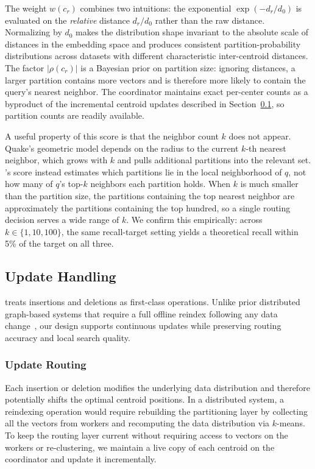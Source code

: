 \documentclass[sigconf,review,anonymous]{acmart}
\begin{document}
    The weight $w(c_r)$ combines two intuitions: the exponential $\exp(- d_r / d_0)$ is evaluated on the \emph{relative} distance $d_r / d_0$ rather than the raw distance. Normalizing by $d_0$ makes the distribution shape invariant to the absolute scale of distances in the embedding space and produces consistent partition-probability distributions across datasets with different characteristic inter-centroid distances. The factor $\lvert\rho(c_r)\rvert$ is a Bayesian prior on partition size: ignoring distances, a larger partition contains more vectors and is therefore more likely to contain the query's nearest neighbor. The coordinator maintains exact per-center counts as a byproduct of the incremental centroid updates described in Section~\ref{sec:update-handling}, so partition counts are readily available.

    A useful property of this score is that the neighbor count $k$ does not appear. Quake's geometric model depends on the radius to the current $k$-th nearest neighbor, which grows with $k$ and pulls additional partitions into the relevant set. \SystemName{}'s score instead estimates which partitions lie in the local neighborhood of $q$, not how many of $q$'s top-$k$ neighbors each partition holds. When $k$ is much smaller than the partition size, the partitions containing the top nearest neighbor are approximately the partitions containing the top hundred, so a single routing decision serves a wide range of $k$. We confirm this empirically: across $k \in \{1, 10, 100\}$, the same recall-target setting yields a theoretical recall within 5\% of the target on all three.
    
\subsection{Update Handling}
\label{sec:update-handling}
    \SystemName{} treats insertions and deletions as first-class operations. Unlike prior distributed graph-based systems that require a full offline reindex following any data change~\cite{deng2019pyramid, gottesbueren2025unleashing}, our design supports continuous updates while preserving routing accuracy and local search quality.

\subsubsection{Update Routing}
    Each insertion or deletion modifies the underlying data distribution and therefore potentially shifts the optimal centroid positions. In a distributed system, a reindexing operation would require rebuilding the partitioning layer by collecting all the vectors from workers and recomputing the data distribution via $k$-means. To keep the routing layer current without requiring access to vectors on the workers or re-clustering, we maintain a live copy of each centroid on the coordinator and update it incrementally.
\end{document}
